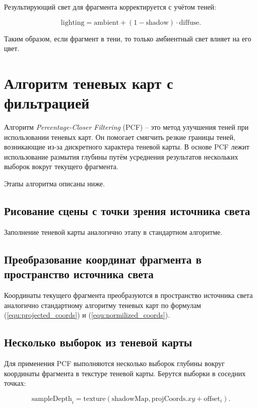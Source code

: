Результирующий свет для фрагмента корректируется с учётом теней:

\begin{equation}
    \label{equ:shadow_map_lambert}
    \text{lighting} = \text{ambient} + (1 - \text{shadow}) \cdot \text{diffuse}.
\end{equation}

Таким образом, если фрагмент в тени, то только амбиентный свет влияет на его цвет.

\section{Алгоритм теневых карт с фильтрацией}

Алгоритм \textit{Percentage-Closer Filtering} (PCF) --
это метод улучшения теней при использовании теневых карт.
Он помогает смягчить резкие границы теней,
возникающие из-за дискретного характера теневой карты.
В основе PCF лежит использование размытия глубины
путём усреднения результатов нескольких выборок вокруг текущего фрагмента.

Этапы алгоритма описаны ниже.

\subsection*{Рисование сцены с точки зрения источника света}

Заполнение теневой карты аналогично этапу в стандартном алгоритме.

\subsection*{Преобразование координат фрагмента в пространство источника света}

Координаты текущего фрагмента преобразуются в пространство источника света
аналогично стандартному алгоритму теневых карт по формулам (\ref{equ:projected_coords})
и (\ref{equ:normilized_coords}).

\subsection*{Несколько выборок из теневой карты}

Для применения PCF выполняются несколько выборок глубины
вокруг координаты фрагмента в текстуре теневой карты.
Берутся выборки в соседних точках:

\begin{equation}
    \label{equ:filtering_pcf}
    \text{sampleDepth}_i = \text{texture}(\text{shadowMap}, \text{projCoords}.xy + \text{offset}_i).
\end{equation}

